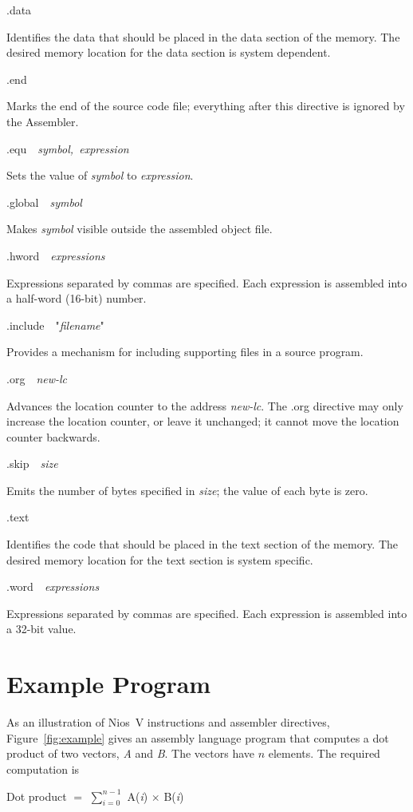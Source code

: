 \documentclass[11pt, twoside, pdftex]{article}
\begin{document}
\noindent
{\sf .data}

\noindent
Identifies the data that should be placed in the data section of the memory.
The desired memory location for the data section is system dependent.

\noindent
{\sf .end}

\noindent
Marks the end of the source code file; everything after this
directive is ignored by the Assembler.

\noindent
{\sf .equ}~~{\it symbol,~expression}

\noindent
Sets the value of {\it symbol} to {\it expression}.
 
\noindent
{\sf .global}~~{\it symbol}

\noindent
Makes {\it symbol} visible outside the assembled object file.

\noindent
{\sf .hword}~~{\it expressions}

\noindent
Expressions separated by commas are specified. Each expression is assembled into
a half-word (16-bit) number.

\noindent
{\sf .include}~~"{\it filename}"

\noindent
Provides a mechanism for including supporting files in a source program.
 
\noindent
{\sf .org}~~{\it new-lc}
 
\noindent
Advances the location counter to the address {\it new-lc}.
The {\sf .org} directive may only increase the location counter, or leave it unchanged; 
it cannot move the location counter backwards.

\noindent
{\sf .skip}~~{\it size}

\noindent
Emits the number of bytes specified in {\it size}; the value of each byte is zero.

\noindent
{\sf .text}

\noindent
Identifies the code that should be placed in the text section of the memory.
The desired memory location for the text section is system specific.

\noindent
{\sf .word}~~{\it expressions}

\noindent
Expressions separated by commas are specified. Each expression is assembled into
a 32-bit value.

\section{Example Program}

As an illustration of Nios~V instructions and assembler directives, 
Figure~\ref{fig:example} gives an assembly language program
that computes a dot product of two vectors, {\it A} and {\it B}. The vectors
have $n$ elements. The required computation is
\begin{center}
Dot product $=$ $\sum_{i = 0}^{n - 1}$ A({\it i}) $\times$ B({\it i})
\end{center}
\end{document}
